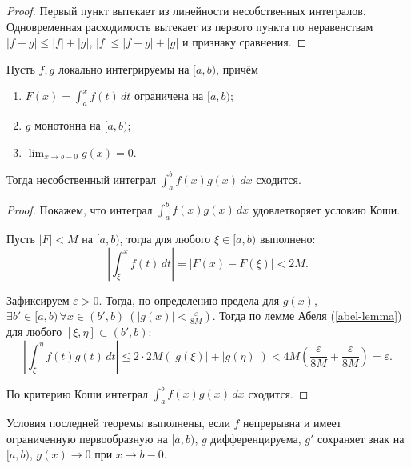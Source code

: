 \begin{proof}
    Первый пункт вытекает из линейности несобственных интегралов. Одновременная расходимость вытекает из первого пункта по неравенствам $|f + g| \leq |f| + |g|$, $|f| \leq |f + g| + |g|$ и признаку сравнения.
\end{proof}

\begin{theorem}
    \label{dirichlet-criterion}

    Пусть $f, g$ локально интегрируемы на $[a, b)$, причём
    \begin{enumerate}
        \item $F(x) = \int_{a}^{x} f(t)\, dt$ ограничена на $[a, b)$;
        \item $g$ монотонна на $[a, b)$;
        \item $\displaystyle \lim_{x \rightarrow b - 0} g(x) = 0$.
    \end{enumerate}

    Тогда несобственный интеграл $\int_a^b f(x)g(x)\, dx$ сходится.

    \begin{proof}
        Покажем, что интеграл $\int_a^b f(x)g(x)\, dx$ удовлетворяет условию Коши.

        Пусть $|F| < M$ на $[a, b)$, тогда для любого $\xi \in [a, b)$ выполнено:
        \[
            \left|\int_\xi^x f(t)\, dt\right| = \left|F(x) - F(\xi)\right| < 2M.
        \]

        Зафиксируем $\varepsilon > 0$. Тогда, по определению предела для $g(x)$, $\exists b' \in [a, b) \, \forall x \in (b', b) \ \left(|g(x)| < \frac{\varepsilon}{8M}\right)$. Тогда по лемме Абеля (\ref{abel-lemma}) для любого $[\xi, \eta] \subset (b', b)$:
        \[
            \left|\int_\xi^\eta f(t)g(t)\, dt \right| \le 2 \cdot 2M\left(|g(\xi)| + |g(\eta)|\right) < 4M\left(\frac{\varepsilon}{8M} + \frac{\varepsilon}{8M}\right) = \varepsilon.
        \]

        По критерию Коши интеграл $\int_a^b f(x)g(x)\, dx$ сходится.
    \end{proof}

    \begin{note}
        Условия последней теоремы выполнены, если $f$ непрерывна и имеет ограниченную первообразную на $[a, b)$, $g$ дифференцируема, $g'$ сохраняет знак на $[a, b)$, $g(x) \to 0$ при $x \rightarrow b - 0$.
    \end{note}
\end{theorem}

